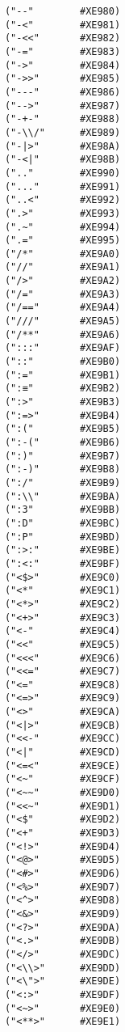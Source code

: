 \documentclass[11pt]{article}
\begin{document}
\begin{verbatim}
            ("--"        #XE980)
            ("-<"        #XE981)
            ("-<<"       #XE982)
            ("-="        #XE983)
            ("->"        #XE984)
            ("->>"       #XE985)
            ("---"       #XE986)
            ("-->"       #XE987)
            ("-+-"       #XE988)
            ("-\\/"      #XE989)
            ("-|>"       #XE98A)
            ("-<|"       #XE98B)
            (".."        #XE990)
            ("..."       #XE991)
            ("..<"       #XE992)
            (".>"        #XE993)
            (".~"        #XE994)
            (".="        #XE995)
            ("/*"        #XE9A0)
            ("//"        #XE9A1)
            ("/>"        #XE9A2)
            ("/="        #XE9A3)
            ("/=="       #XE9A4)
            ("///"       #XE9A5)
            ("/**"       #XE9A6)
            (":::"       #XE9AF)
            ("::"        #XE9B0)
            (":="        #XE9B1)
            (":≡"        #XE9B2)
            (":>"        #XE9B3)
            (":=>"       #XE9B4)
            (":("        #XE9B5)
            (":-("       #XE9B6)
            (":)"        #XE9B7)
            (":-)"       #XE9B8)
            (":/"        #XE9B9)
            (":\\"       #XE9BA)
            (":3"        #XE9BB)
            (":D"        #XE9BC)
            (":P"        #XE9BD)
            (":>:"       #XE9BE)
            (":<:"       #XE9BF)
            ("<$>"       #XE9C0)
            ("<*"        #XE9C1)
            ("<*>"       #XE9C2)
            ("<+>"       #XE9C3)
            ("<-"        #XE9C4)
            ("<<"        #XE9C5)
            ("<<<"       #XE9C6)
            ("<<="       #XE9C7)
            ("<="        #XE9C8)
            ("<=>"       #XE9C9)
            ("<>"        #XE9CA)
            ("<|>"       #XE9CB)
            ("<<-"       #XE9CC)
            ("<|"        #XE9CD)
            ("<=<"       #XE9CE)
            ("<~"        #XE9CF)
            ("<~~"       #XE9D0)
            ("<<~"       #XE9D1)
            ("<$"        #XE9D2)
            ("<+"        #XE9D3)
            ("<!>"       #XE9D4)
            ("<@>"       #XE9D5)
            ("<#>"       #XE9D6)
            ("<%>"       #XE9D7)
            ("<^>"       #XE9D8)
            ("<&>"       #XE9D9)
            ("<?>"       #XE9DA)
            ("<.>"       #XE9DB)
            ("</>"       #XE9DC)
            ("<\\>"      #XE9DD)
            ("<\">"      #XE9DE)
            ("<:>"       #XE9DF)
            ("<~>"       #XE9E0)
            ("<**>"      #XE9E1)

\end{verbatim}
\end{document}
